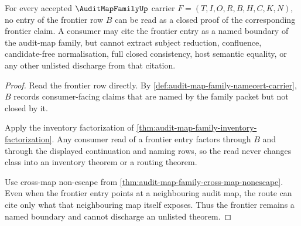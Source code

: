 \begin{theorem}
\label{thm:audit-map-family-frontier-nonescape}
For every accepted $\AuditMapFamilyUp$ carrier $F=(T,I,O,R,B,H,C,K,N)$, no entry of the frontier row $B$ can be read as a closed proof of the corresponding frontier claim. A consumer may cite the frontier entry as a named boundary of the audit-map family, but cannot extract subject reduction, confluence, candidate-free normalisation, full closed consistency, host semantic equality, or any other unlisted discharge from that citation.
\end{theorem}
\begin{proof}
Read the frontier row directly. By \autoref{def:audit-map-family-namecert-carrier}, $B$ records consumer-facing claims that are named by the family packet but not closed by it.

Apply the inventory factorization of \autoref{thm:audit-map-family-inventory-factorization}. Any consumer read of a frontier entry factors through $B$ and through the displayed continuation and naming rows, so the read never changes class into an inventory theorem or a routing theorem.

Use cross-map non-escape from \autoref{thm:audit-map-family-cross-map-nonescape}. Even when the frontier entry points at a neighbouring audit map, the route can cite only what that neighbouring map itself exposes. Thus the frontier remains a named boundary and cannot discharge an unlisted theorem.
\end{proof}



